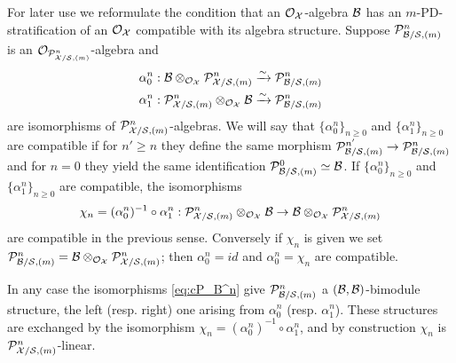 \documentclass{article}
\theoremstyle{change}
\numberwithin{equation}{subsubsection}
\begin{document}
For later use we reformulate the condition that an ${\cal O}_{\cal X}$-algebra
${\cal B}$ has an $m$-PD-stratification of an ${\cal O}_{\cal X}$ compatible with its
algebra structure. Suppose ${\cal P}^n_{{\cal B}/{\cal S},(m)}$ is an
${\cal O}_{{\cal P}^n_{{\cal X}/{\cal S},(m)}}$-algebra and 
\begin{equation}
  \label{eq:cP_B^n}
  \begin{split}
    \alpha^n_0:{\cal B}\otimes_{{\cal O}_{\cal X}}{\cal P}^n_{{\cal X}/{\cal S},(m)}&\xrightarrow{\sim}{\cal P}^n_{{\cal B}/{\cal S},(m)}\\
    \alpha^n_1:{\cal P}^n_{{\cal X}/{\cal S},(m)}\otimes_{{\cal O}_{\cal X}}{\cal B}&\xrightarrow{\sim}{\cal P}^n_{{\cal B}/{\cal S},(m)}
  \end{split}
\end{equation}
are isomorphisms of ${\cal P}^n_{{\cal X}/{\cal S},(m)}$-algebras. We will say that
$\{\alpha^n_0\}_{n\ge0}$ and $\{\alpha^n_1\}_{n\ge0}$ are compatible
if for $n'\ge n$ they define the same morphism
${\cal P}^{n'}_{{\cal B}/{\cal S},(m)}\to{\cal P}^n_{{\cal B}/{\cal S},(m)}$ and for $n=0$ they
yield the same identification ${\cal P}^0_{{\cal B}/{\cal S},(m)}\simeq{\cal B}$. If
$\{\alpha^n_0\}_{n\ge0}$ and $\{\alpha^n_1\}_{n\ge0}$ are compatible,
the isomorphisms
\begin{equation}
  \label{eq:alpha-to-chi}
  \chi_n=(\alpha^n_0)^{-1}\circ\alpha^n_1:
  {\cal P}^n_{{\cal X}/{\cal S},(m)}\otimes_{{\cal O}_{\cal X}}{\cal B}\to{\cal B}\otimes_{{\cal O}_{\cal X}}{\cal P}^n_{{\cal X}/{\cal S},(m)}  
\end{equation}
are compatible in the previous sense. Conversely if $\chi_n$ is given
we set ${\cal P}^n_{{\cal B}/{\cal S},(m)}={\cal B}\otimes_{{\cal O}_{\cal X}}{\cal P}^n_{{\cal X}/{\cal S},(m)}$; then
$\alpha^n_0=id$ and $\alpha^n_0=\chi_n$ are compatible.

In any case the isomorphisms \ref{eq:cP_B^n} give
${\cal P}^n_{{\cal B}/{\cal S},(m)}$ a $({\cal B},{\cal B})$-bimodule structure, the left
(resp. right) one arising from $\alpha^n_0$
(resp. $\alpha^n_1$). These structures are exchanged by the
isomorphism $\chi_n=(\alpha^n_0)^{-1}\circ\alpha^n_1$, and by
construction $\chi_n$ is ${\cal P}^n_{{\cal X}/{\cal S},(m)}$-linear.
\end{document}
